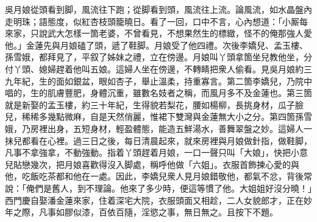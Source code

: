 吳月娘從頭看到脚，風流往下跑；從脚看到頭，風流往上流。{}論風流，如水晶盤內走明珠；{}語態度，似紅杏枝頭籠曉日。看了一回，口中不言，心內想道：「小厮每來家，只說武大怎樣一箇老婆，不曾看見，不想果然生的標緻，怪不的俺那強人愛他。」{}金蓮先與月娘磕了頭，遞了鞋脚。月娘受了他四禮。次後李嬌兒、孟玉樓、孫雪娥，都拜見了，平叙了姊妹之禮，立在傍邊。月娘叫丫頭拿箇坐兒教他坐，分付丫頭、媳婦趕着他叫五娘。這婦人坐在傍邊，不轉睛把衆人偷看。見吳月娘約三九年紀，生的面如銀盆，眼如杏子，舉止溫柔，持重寡言。第二箇李嬌兒，乃院中唱的，生的肌膚豐肥，身體沉重，雖數名妓者之稱，而風月多不及金蓮也。第三箇就是新娶的孟玉樓，約三十年紀，生得貌若梨花，腰如楊柳，長挑身材，瓜子臉兒，稀稀多幾點微麻，自是天然俏麗，惟裙下雙灣與金蓮無大小之分。第四箇孫雪娥，乃房裡出身，五短身材，輕盈體態，能造五鮮湯水，善舞翠盤之妙。這婦人一抹兒都看在心裡。過三日之後，每日清晨起來，就來房裡與月娘做針指，做鞋脚，凡事不拿強拿，不動強動。{}指着丫頭趕着月娘，一口一聲只叫「大娘」，快把小意兒貼戀幾次，把月娘喜歡得沒入脚處，稱呼他做「六姐」。衣服首飾揀心愛的與他，吃飯吃茶都和他在一處。{}因此，李嬌兒衆人見月娘錯敬他，都氣不忿，背後常說：「俺們是舊人，到不理論。他來了多少時，便這等慣了他。大姐姐好沒分曉！」西門慶自娶潘金蓮來家，住着深宅大院，衣服頭面又相趁，二人女貌郎才，正在妙年之際，凡事如膠似漆，百依百隨，淫慾之事，無日無之。且按下不題。

